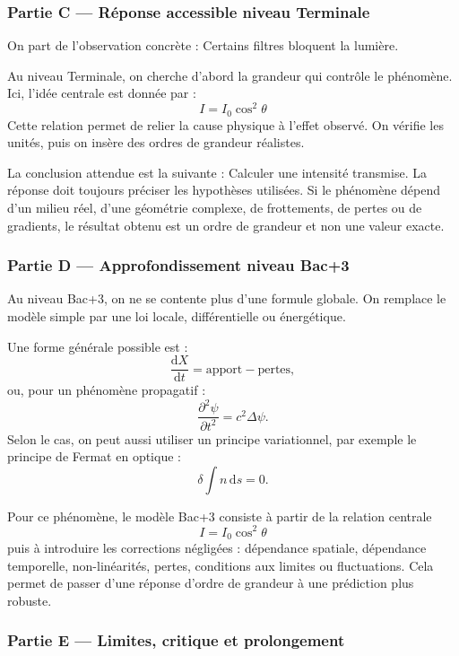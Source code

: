 \documentclass[11pt,a4paper]{article}
\begin{document}
\subsubsection*{Partie C — Réponse accessible niveau Terminale}

\begin{corrigebox}
On part de l'observation concrète : Certains filtres bloquent la lumière.

Au niveau Terminale, on cherche d'abord la grandeur qui contrôle le phénomène. Ici, l'idée centrale est donnée par :
\[
I=I_0\cos^2\theta
\]
Cette relation permet de relier la cause physique à l'effet observé. On vérifie les unités, puis on insère des ordres de grandeur réalistes.

La conclusion attendue est la suivante : Calculer une intensité transmise. La réponse doit toujours préciser les hypothèses utilisées. Si le phénomène dépend d'un milieu réel, d'une géométrie complexe, de frottements, de pertes ou de gradients, le résultat obtenu est un ordre de grandeur et non une valeur exacte.
\end{corrigebox}

\subsubsection*{Partie D — Approfondissement niveau Bac+3}

\begin{approfondissementbox}
Au niveau Bac+3, on ne se contente plus d'une formule globale. On remplace le modèle simple par une loi locale, différentielle ou énergétique.

Une forme générale possible est :
\[
\frac{\mathrm d X}{\mathrm dt}=\text{apport}-\text{pertes},
\]
ou, pour un phénomène propagatif :
\[
\frac{\partial^2 \psi}{\partial t^2}=c^2\Delta\psi.
\]
Selon le cas, on peut aussi utiliser un principe variationnel, par exemple le principe de Fermat en optique :
\[
\delta \int n\,\mathrm ds=0.
\]

Pour ce phénomène, le modèle Bac+3 consiste à partir de la relation centrale
\[
I=I_0\cos^2\theta
\]
puis à introduire les corrections négligées : dépendance spatiale, dépendance temporelle, non-linéarités, pertes, conditions aux limites ou fluctuations. Cela permet de passer d'une réponse d'ordre de grandeur à une prédiction plus robuste.
\end{approfondissementbox}

\subsubsection*{Partie E — Limites, critique et prolongement}
\end{document}
